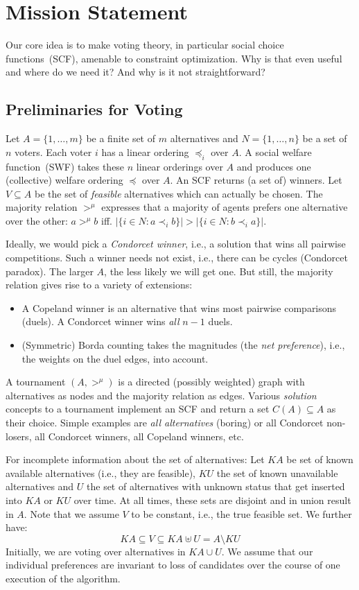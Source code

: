 \documentclass[10pt,a4paper,fleqn]{article}
\begin{document}
\section{Mission Statement}
Our core idea is to make voting theory, in particular social choice functions~(SCF), amenable
to constraint optimization. Why is that even useful and where do we need it? And why is it not
straightforward?
\subsection{Preliminaries for Voting}
Let $A = \{1, \ldots, m\}$ be a finite set of $m$ alternatives and $N = \{1, \ldots, n\}$ be
a set of $n$ voters. Each voter $i$ has a linear ordering $\preceq_i$ over $A$.
A social welfare function~(SWF) takes these $n$ linear orderings over $A$ and produces
one (collective) welfare ordering $\preceq$ over $A$. An SCF returns (a set of) winners.
Let $V \subseteq A$ be the set of \emph{feasible} alternatives which can actually be chosen.
The majority relation ${>^{\mu}}$ expresses that a majority of agents prefers one alternative over 
the other: $a >^\mu b$ iff. $|\{i \in N : a \prec_i b\}| > |\{i \in N : b \prec_i a\}|$.

Ideally, we would pick a \emph{Condorcet winner}, i.e., a solution that wins all pairwise competitions.
Such a winner needs not exist, i.e., there can be cycles (Condorcet paradox). The larger $A$, the less likely
we will get one. But still, the majority relation gives rise to a variety of extensions:
\begin{itemize}
\item A Copeland winner is an alternative that wins most pairwise comparisons (duels). A Condorcet winner
wins \emph{all} $n-1$ duels.
\item (Symmetric) Borda counting takes the magnitudes (the \emph{net preference}), i.e., the weights on the duel edges,
into account.
\end{itemize}
A tournament $(A, >^\mu)$ is a directed (possibly weighted) graph with alternatives as nodes and the majority relation
as edges. Various \emph{solution} concepts to a tournament implement an SCF and return a set $C(A) \subseteq A$ as their choice.
Simple examples are \emph{all alternatives} (boring) or all Condorcet non-losers, all Condorcet winners, all Copeland winners, etc.

For incomplete information about the set of alternatives: Let $\mathit{KA}$ be set of
known available alternatives (i.e., they are feasible), $\mathit{KU}$ the set of known unavailable alternatives
and $U$ the set of alternatives with unknown status that get inserted into $\mathit{KA}$ or $\mathit{KU}$ over time.
At all times, these sets are disjoint and in union result in $A$.
Note that we assume $V$ to be constant, i.e., the true feasible set.
 We further have:
\[
\mathit{KA} \subseteq V \subseteq \mathit{KA} \uplus U = A \setminus \mathit{KU}
\]
Initially, we are voting over alternatives in $\mathit{KA} \cup U$. We assume that 
our individual preferences are invariant to loss of candidates over the course 
of one execution of the algorithm.
\end{document}
